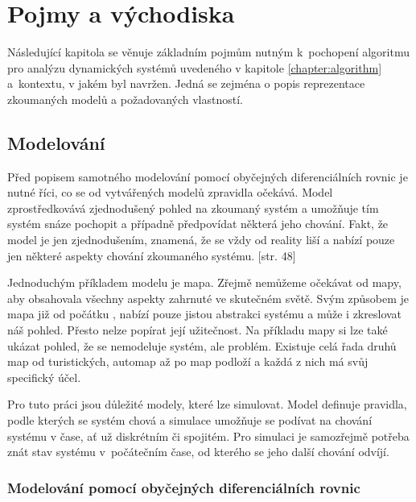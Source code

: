 \chapter{Pojmy a východiska}

Následující kapitola se věnuje základním pojmům nutným k~pochopení
algoritmu pro analýzu dynamických systémů uvedeného v kapitole \ref{chapter:algorithm}
a~kontextu, v jakém byl navržen. Jedná se zejména o popis reprezentace zkou\-ma\-ných
modelů a požadovaných vlastností.


\section{Modelování}

Před popisem samotného modelování pomocí obyčejných diferenciálních rovnic je
nutné říci, co se od vytvářených modelů zpravidla očekává. Model zpro\-středko\-vá\-vá
zjednodušený pohled na zkoumaný systém a umožňuje tím systém snáze pochopit a
případně předpovídat některá jeho chování. Fakt, že model je jen zjednodušením, znamená,
že se vždy od reality liší a nabízí pouze jen některé aspekty chování zkoumaného
systému. [str. 48]


Jednoduchým příkladem modelu je mapa. Zřejmě nemůžeme očekávat od mapy, aby obsahovala
všechny aspekty zahrnuté ve skutečném světě. Svým způsobem je mapa již od počátku
, nabízí pouze jistou abstrakci systému a může i zkreslovat náš pohled.
Přesto nelze popírat její užitečnost. Na příkladu mapy si lze také ukázat pohled, že se
nemodeluje systém, ale problém. Existuje celá řada druhů map od turistických, automap
až po map podloží a každá z nich má svůj specifický účel. \cite[str. 47 -- 58]{pelanek2012}

Pro tuto práci jsou důležité modely, které lze simulovat. Model definuje pravidla, podle
kterých se systém chová a simulace umožňuje se podívat na chování systému v čase, ať už
diskrétním či spojitém. Pro simulaci je sa\-mozřej\-mě potřeba znát stav systému v~počátečním
čase, od kterého se jeho další chování odvíjí.

\subsection{Modelování pomocí obyčejných diferenciálních rovnic}

